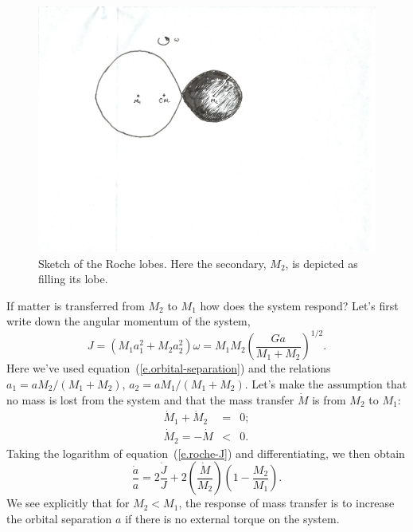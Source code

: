 \begin{figure}[htbp]
\includegraphics{Figures/roche-sketch}
\caption[Schematic of Roche lobes]{\label{f.roche} Sketch of the Roche lobes. Here the secondary, $M_{2}$, is depicted as filling its lobe.}
\end{figure}

If matter is transferred from $M_{2}$ to $M_{1}$ how does the system respond?  Let's first write down the angular momentum of the system,
\begin{equation}\label{e.roche-J}
J = (M_{1}a_{1}^{2} + M_{2}a_{2}^{2}) \omega = M_{1}M_{2}\left(\frac{Ga}{M_{1}+M_{2}}\right)^{1/2}.
\end{equation}
Here we've used equation~(\ref{e.orbital-separation}) and the relations $a_{1} = aM_{2}/(M_{1}+M_{2})$, $a_{2} = aM_{1}/(M_{1}+M_{2})$.  Let's make the assumption that no mass is lost from the system and that the mass transfer $\dot{M}$ is from $M_{2}$ to $M_{1}$:
\begin{eqnarray*}
\dot{M}_{1} + \dot{M}_{2} &=& 0;\\
\dot{M}_{2} = -\dot{M} &<& 0.
\end{eqnarray*}
Taking the logarithm of equation~(\ref{e.roche-J}) and differentiating, we then obtain
\begin{equation}\label{e.roche-adot}
\frac{\dot{a}}{a} = 2\frac{\dot{J}}{J}  + 2 \left(\frac{\dot{M}}{M_{2}}\right) \left(1-\frac{M_{2}}{M_{1}}\right).
\end{equation}
We see explicitly that for $M_{2}< M_{1}$, the response of mass transfer is to increase the orbital separation $a$ if there is no external torque on the system.


